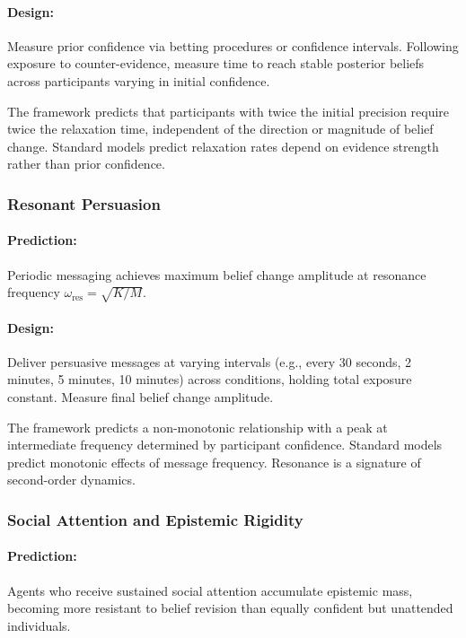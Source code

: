 \documentclass[12pt]{article}
\begin{document}
\paragraph{Design:} Measure prior confidence via betting procedures or confidence intervals. Following exposure to counter-evidence, measure time to reach stable posterior beliefs across participants varying in initial confidence.

The framework predicts that participants with twice the initial precision require twice the relaxation time, independent of the direction or magnitude of belief change. Standard models predict relaxation rates depend on evidence strength rather than prior confidence.

\subsubsection{Resonant Persuasion}

\paragraph{Prediction:} Periodic messaging achieves maximum belief change amplitude at resonance frequency $\omega_{\text{res}} = \sqrt{K/M}$.

\paragraph{Design:} Deliver persuasive messages at varying intervals (e.g., every 30 seconds, 2 minutes, 5 minutes, 10 minutes) across conditions, holding total exposure constant. Measure final belief change amplitude.

The framework predicts a non-monotonic relationship with a peak at intermediate frequency determined by participant confidence. Standard models predict monotonic effects of message frequency. Resonance is a signature of second-order dynamics.

\subsubsection{Social Attention and Epistemic Rigidity}

 

\paragraph{Prediction:} Agents who receive sustained social attention accumulate epistemic mass, becoming more resistant to belief revision than equally confident but unattended individuals.
\end{document}
